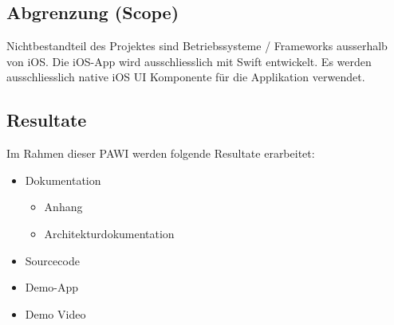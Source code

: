 \subsection{Abgrenzung (Scope)}
Nichtbestandteil des Projektes sind Betriebssysteme / Frameworks ausserhalb von iOS. Die iOS-App wird ausschliesslich mit Swift entwickelt. Es werden ausschliesslich native iOS UI Komponente für die Applikation verwendet.

\subsection{Resultate}
Im Rahmen dieser PAWI werden folgende Resultate erarbeitet:
\begin{itemize}
    \item Dokumentation
    \begin{itemize}
        \item Anhang
        \item Architekturdokumentation
    \end{itemize}
    \item Sourcecode
    \item Demo-App
    \item Demo Video
\end{itemize}